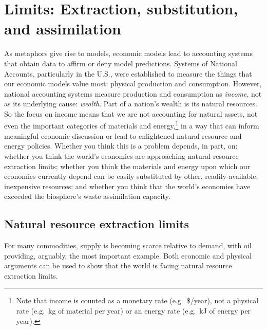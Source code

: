 \section{Limits: Extraction, substitution, and assimilation}
\label{sec:limits}

As metaphors give rise to models, 
economic models lead to accounting systems that obtain data
to affirm or deny model predictions.
Systems of National Accounts, 
particularly in the U.S., 
were established to measure the things that 
our economic models value most: 
physical production and consumption. 
However, national accounting systems measure production and consumption 
as \emph{income}, not as its underlying cause: \emph{wealth}.
Part of a nation's wealth is its natural resources.
So the focus on income means that we are not accounting for natural assets, 
not even the important categories of materials and energy,\footnote{Note that
	income is counted as a monetary rate (e.g.\ \$/year), 
	not a physical rate (e.g.\ kg of material per year)
	or an energy rate (e.g.\ kJ of energy per year).
	} 
in a way that can inform meaningful economic discussion or
lead to enlightened natural resource and energy policies.
Whether you think this is a problem depends, in part, on:
whether you think the world's economies are approaching 
	natural resource extraction limits;
whether you think the materials and energy upon which our economies currently depend
	can be easily substituted by other, readily-available, inexpensive resources; and
whether you think that the world's economies have exceeded 
	the biosphere's waste assimilation capacity.


\subsection{Natural resource extraction limits}
\label{sub:natural_resource_extraction_limits}

For many commodities, 
supply is becoming scarce relative to demand, 
with oil providing, arguably, the most important example. 
Both economic and physical arguments can be used to show that the world is facing
natural resource extraction limits.

